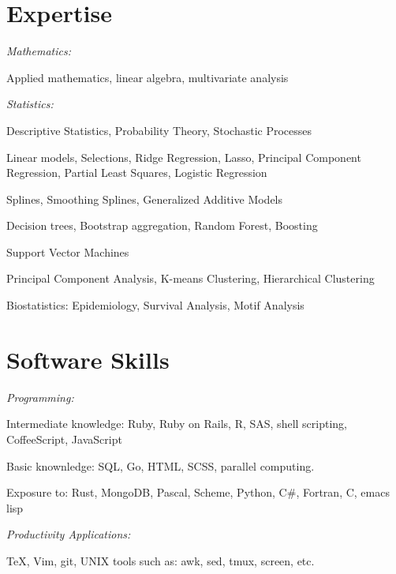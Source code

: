 %
%
\section{Expertise}
\textit{Mathematics:}
\begin{innerlist}
    \item Applied mathematics, linear algebra, multivariate analysis
\end{innerlist}

\halfblankline

\textit{Statistics:}
\begin{innerlist}
    \item Descriptive Statistics, Probability Theory, Stochastic Processes
    \item Linear models, Selections, Ridge Regression, Lasso, Principal Component Regression, Partial Least Squares, Logistic Regression
    \item Splines, Smoothing Splines, Generalized Additive Models
    \item Decision trees, Bootstrap aggregation, Random Forest, Boosting
    \item Support Vector Machines
    \item Principal Component Analysis, K-means Clustering, Hierarchical Clustering
    \item Biostatistics: Epidemiology, Survival Analysis, Motif Analysis
\end{innerlist}

%
%
\section{Software Skills}
\textit{Programming:}
\begin{innerlist}
    \item Intermediate knowledge: Ruby, Ruby on Rails, R, SAS, shell scripting, CoffeeScript, JavaScript
    \item Basic knownledge: SQL, Go, HTML, SCSS, parallel computing.
    \item Exposure to: Rust, MongoDB, Pascal, Scheme, Python, C\#, Fortran, C, emacs lisp
\end{innerlist}

\halfblankline

\textit{Productivity Applications:}
\begin{innerlist}
\item \TeX{}, Vim, git, UNIX tools such as: awk, sed, tmux, screen, etc.
\end{innerlist}

